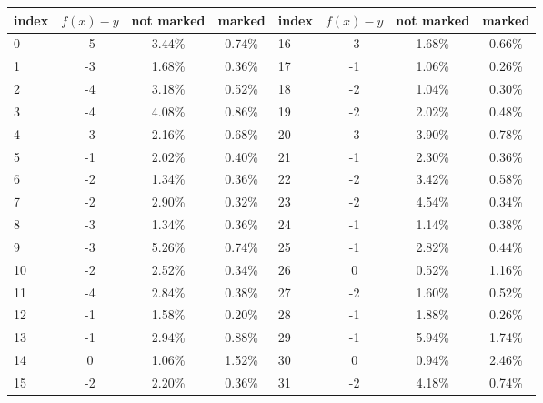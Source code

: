 \documentclass[reqno,10pt]{amsart}
\numberwithin{equation}{section}                %
\begin{document}
\begin{center}
\begin{tiny}
\begin{tabular}{|l|c|c|c||l|c|c|c|}
   \hline
   index & $f (x) - y$ & not marked & marked & index & $f (x) - y$ & not marked & marked \\
   \hline
   0 & -5 & {\color{ForestGreen} 3.44\%} & {\color{Red} 0.74\%} & 16 & -3 & {\color{ForestGreen} 1.68\%} & {\color{Red} 0.66\%} \\
   1 & -3 & {\color{ForestGreen} 1.68\%} & {\color{Red} 0.36\%} & 17 & -1 & {\color{ForestGreen} 1.06\%} & {\color{Red} 0.26\%} \\
   2 & -4 & {\color{ForestGreen} 3.18\%} & {\color{Red} 0.52\%} & 18 & -2 & {\color{ForestGreen} 1.04\%} & {\color{Red} 0.30\%} \\
   3 & -4 & {\color{ForestGreen} 4.08\%} & {\color{Red} 0.86\%} & 19 & -2 & {\color{ForestGreen} 2.02\%} & {\color{Red} 0.48\%} \\
   4 & -3 & {\color{ForestGreen} 2.16\%} & {\color{Red} 0.68\%} & 20 & -3 & {\color{ForestGreen} 3.90\%} & {\color{Red} 0.78\%} \\
   5 & -1 & {\color{ForestGreen} 2.02\%} & {\color{Red} 0.40\%} & 21 & -1 & {\color{ForestGreen} 2.30\%} & {\color{Red} 0.36\%} \\
   6 & -2 & {\color{ForestGreen} 1.34\%} & {\color{Red} 0.36\%} & 22 & -2 & {\color{ForestGreen} 3.42\%} & {\color{Red} 0.58\%} \\
   7 & -2 & {\color{ForestGreen} 2.90\%} & {\color{Red} 0.32\%} & 23 & -2 & {\color{ForestGreen} 4.54\%} & {\color{Red} 0.34\%} \\
   8 & -3 & {\color{ForestGreen} 1.34\%} & {\color{Red} 0.36\%} & 24 & -1 & {\color{ForestGreen} 1.14\%} & {\color{Red} 0.38\%} \\
   9 & -3 & {\color{ForestGreen} 5.26\%} & {\color{Red} 0.74\%} & 25 & -1 & {\color{ForestGreen} 2.82\%} & {\color{Red} 0.44\%} \\
   10 & -2 & {\color{ForestGreen} 2.52\%} & {\color{Red} 0.34\%} & 26 & 0 & {\color{Red} 0.52\%} & {\color{ForestGreen} 1.16\%} \\
   11 & -4 & {\color{ForestGreen} 2.84\%} & {\color{Red} 0.38\%} & 27 & -2 & {\color{ForestGreen} 1.60\%} & {\color{Red} 0.52\%} \\
   12 & -1 & {\color{ForestGreen} 1.58\%} & {\color{Red} 0.20\%} & 28 & -1 & {\color{ForestGreen} 1.88\%} & {\color{Red} 0.26\%} \\
   13 & -1 & {\color{ForestGreen} 2.94\%} & {\color{Red} 0.88\%} & 29 & -1 & {\color{ForestGreen} 5.94\%} & {\color{Red} 1.74\%} \\
   14 & 0 & {\color{Red} 1.06\%} & {\color{ForestGreen} 1.52\%} & 30 & 0 & {\color{Red} 0.94\%} & {\color{ForestGreen} 2.46\%} \\
   15 & -2 & {\color{ForestGreen} 2.20\%} & {\color{Red} 0.36\%} & 31 & -2 & {\color{ForestGreen} 4.18\%} & {\color{Red} 0.74\%} \\
   \hline
\end{tabular}
\end{tiny}
\end{center}
\end{document}
